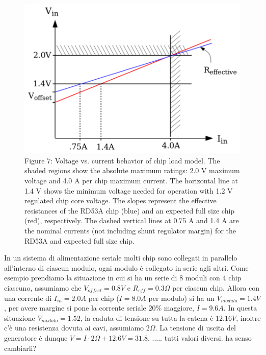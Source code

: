 \begin{figure}
\centering
\includegraphics[scale=.3]{Immagini/VoltageVsCurrent}
\caption{Figure 7: Voltage vs. current behavior of chip load model. The shaded regions show the absolute
maximum ratings: 2.0 V maximum voltage and 4.0 A per chip maximum current. The horizontal
line at 1.4 V shows the minimum voltage needed for operation with 1.2 V regulated chip core
voltage. The slopes represent the effective resistances of the RD53A chip (blue) and an expected
full size chip (red), respectively. The dashed vertical lines at 0.75 A and 1.4 A are the nominal
currents (not including shunt regulator margin) for the RD53A and expected full size chip.}
\label{VVC}
\end{figure}

In un sistema di alimentazione seriale molti chip sono collegati in parallelo all'interno di ciascun modulo, ogni modulo è collegato in serie agli altri. 
Come esempio prendiamo la situazione in cui si ha un serie di 8 moduli con 4 chip ciascuno, assumiamo che $V_{offset}=0.8V$ e $R_{eff}=0.3 \Omega$ per ciascun chip. Allora con una corrente di $I_{in}=2.0 A$ per chip ($I=8.0 A$ per modulo) si ha un $V_{modulo}=1.4 V$, per avere margine si pone la corrente seriale $20 \%$ maggiore, $I=9.6A$. 
In questa situazione $V_{modulo}=1.52$, la caduta di tensione su tutta la catena è $12.16V$, inoltre c'è una resistenza dovuta ai cavi, assumiamo $2 \Omega$. La tensione di uscita del generatore è dunque $V=I \cdot 2 \Omega +12.6V=31.8$. 
..... tutti valori diversi. ha senso cambiarli?

